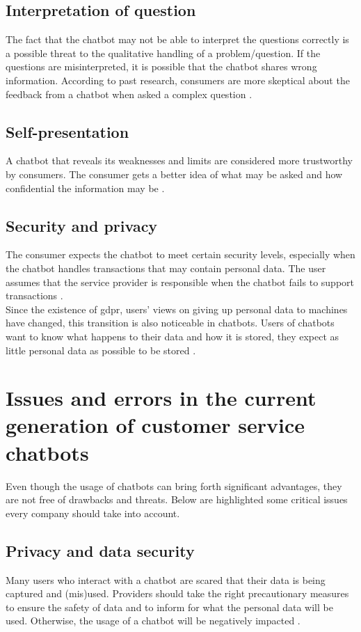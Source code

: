 \subsection{Interpretation of question}
The fact that the chatbot may not be able to interpret the questions correctly is a possible threat to the qualitative handling of a problem/question. If the questions are misinterpreted, it is possible that the chatbot shares wrong information. According to past research, consumers are more skeptical about the feedback from a chatbot when asked a complex question \citep*{Folstad2018,Nordheim2019}.\\

\subsection{Self-presentation}
A chatbot that reveals its weaknesses and limits are considered more trustworthy by consumers. The consumer gets a better idea of what may be asked and how confidential the information may be \citep{Folstad2018}.

\subsection{Security and privacy}
The consumer expects the chatbot to meet certain security levels, especially when the chatbot handles transactions that may contain personal data. The user assumes that the service provider is responsible when the chatbot fails to support transactions \citep*{Folstad2018, Nordheim2019}.\\
\break
Since the existence of \acrfull{gdpr}, users' views on giving up personal data to machines have changed, this transition is also noticeable in chatbots. Users of chatbots want to know what happens to their data and how it is stored, they expect as little personal data as possible to be stored \citep*{Folstad2018, Nordheim2019}. 

\section{Issues and errors in the current generation of customer service chatbots}
Even though the usage of chatbots can bring forth significant advantages, they are not free of drawbacks and threats. Below are highlighted some critical issues every company should take into account.

\subsection{Privacy and data security}
Many users who interact with a chatbot are scared that their data is being captured and (mis)used. Providers should take the right precautionary measures to ensure the safety of data and to inform for what the personal data will be used. Otherwise, the usage of a chatbot will be negatively impacted \citep*{Adamopoulou2020, Duka2021, Rese2020}.

